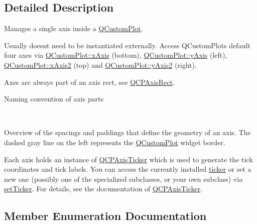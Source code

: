 \subsection{Detailed Description}
Manages a single axis inside a \hyperlink{class_q_custom_plot}{Q\+Custom\+Plot}. 

Usually doesn\textquotesingle{}t need to be instantiated externally. Access Q\+Custom\+Plot\textquotesingle{}s default four axes via \hyperlink{class_q_custom_plot_a9a79cd0158a4c7f30cbc702f0fd800e4}{Q\+Custom\+Plot\+::x\+Axis} (bottom), \hyperlink{class_q_custom_plot_af6fea5679725b152c14facd920b19367}{Q\+Custom\+Plot\+::y\+Axis} (left), \hyperlink{class_q_custom_plot_ada41599f22cad901c030f3dcbdd82fd9}{Q\+Custom\+Plot\+::x\+Axis2} (top) and \hyperlink{class_q_custom_plot_af13fdc5bce7d0fabd640f13ba805c0b7}{Q\+Custom\+Plot\+::y\+Axis2} (right).

Axes are always part of an axis rect, see \hyperlink{class_q_c_p_axis_rect}{Q\+C\+P\+Axis\+Rect}.  \begin{center}Naming convention of axis parts\end{center}  ~\newline
  \begin{center}Overview of the spacings and paddings that define the geometry of an axis. The dashed gray line on the left represents the \hyperlink{class_q_custom_plot}{Q\+Custom\+Plot} widget border.\end{center} 

Each axis holds an instance of \hyperlink{class_q_c_p_axis_ticker}{Q\+C\+P\+Axis\+Ticker} which is used to generate the tick coordinates and tick labels. You can access the currently installed \hyperlink{class_q_c_p_axis_acdd672979a52b1f31e2da3518c92616d}{ticker} or set a new one (possibly one of the specialized subclasses, or your own subclass) via \hyperlink{class_q_c_p_axis_a4ee03fcd2c74d05cd1a419b9af5cfbdc}{set\+Ticker}. For details, see the documentation of \hyperlink{class_q_c_p_axis_ticker}{Q\+C\+P\+Axis\+Ticker}. 

\subsection{Member Enumeration Documentation}
